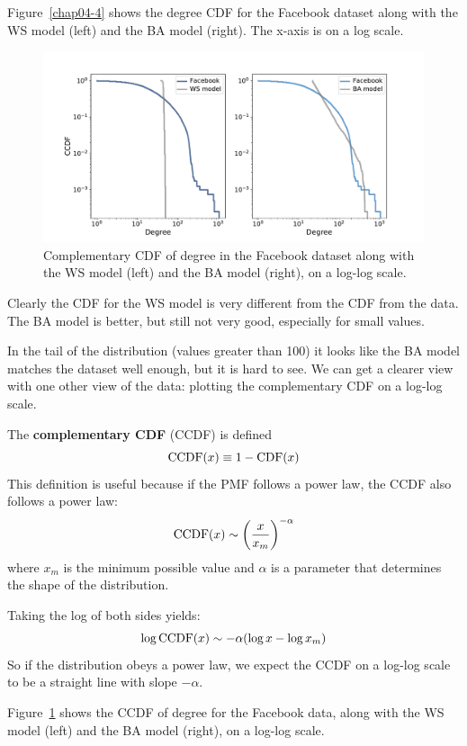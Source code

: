 \documentclass[12pt]{book}
\theoremstyle{exercise}
\begin{document}
Figure~\ref{chap04-4} shows the degree CDF for the Facebook dataset
along with the WS model (left) and the BA model (right).  The x-axis
is on a log scale.

\begin{figure}
\centerline{\includegraphics[width=5.5in]{figs/chap04-5.pdf}}
\caption{Complementary CDF of degree in the Facebook dataset along with the WS model (left) and the BA model (right), on a log-log scale.}
\label{chap04-5}
\end{figure}

Clearly the CDF for the WS model is very different from the CDF
from the data.  The BA model is better, but still not very good,
especially for small values.


In the tail of the distribution (values greater than 100) it looks
like the BA model matches the dataset well enough, but it is
hard to see.  We can get a clearer view with one other view of the
data: plotting the complementary CDF on a log-log scale.

The {\bf complementary CDF} (CCDF) is defined
%
\[ \mathrm{CCDF}(x) \equiv 1 - \mathrm{CDF}(x) \]
%
This definition is useful because if the PMF follows a power law, the CCDF
also follows a power law:
%
\[ \mathrm{CCDF}(x) \sim \left( \frac{x}{x_m} \right)^{-\alpha} \]
%
where $x_m$ is the minimum possible value and $\alpha$ is a parameter
that determines the shape of the distribution.

Taking the log of both sides yields:
%
\[ \log \mathrm{CCDF}(x) \sim -\alpha (\log x - \log x_m) \]
%
So if the distribution obeys a power law, we expect the CCDF on
a log-log scale to be a straight line with slope $-\alpha$.


Figure~\ref{chap04-5} shows the CCDF of degree for the Facebook data,
along with the WS model (left) and the BA model (right), on a log-log
scale.
\end{document}
